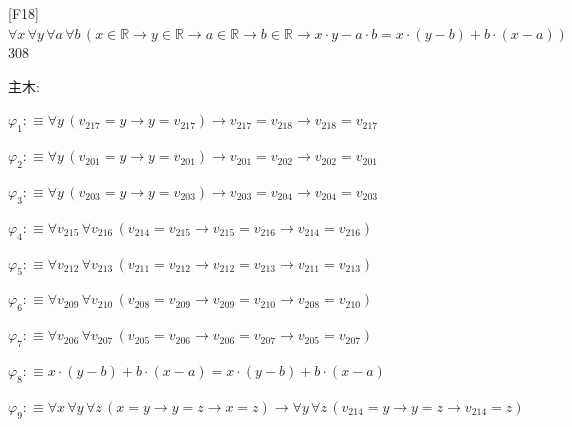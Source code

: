 \begin{fullproof}{[F18]}{$\forall x\,\forall y\,\forall a\,\forall b\,(x \in \mathbb{R} \to y \in \mathbb{R} \to a \in \mathbb{R} \to b \in \mathbb{R} \to x \cdot y - a \cdot b = x \cdot (y - b) + b \cdot (x - a))$}{308}
\begin{ptree}
\noLine
{}
\end{ptree}
\noindent 主木:
\begin{ptree}
\noLine
{}
\noLine
{}
\end{ptree}
\begin{abbrevlist}
\item $\varphi_{1} :\equiv \forall y\,(v_{217} = y \to y = v_{217}) \to v_{217} = v_{218} \to v_{218} = v_{217}$
\item $\varphi_{2} :\equiv \forall y\,(v_{201} = y \to y = v_{201}) \to v_{201} = v_{202} \to v_{202} = v_{201}$
\item $\varphi_{3} :\equiv \forall y\,(v_{203} = y \to y = v_{203}) \to v_{203} = v_{204} \to v_{204} = v_{203}$
\item $\varphi_{4} :\equiv \forall v_{215}\,\forall v_{216}\,(v_{214} = v_{215} \to v_{215} = v_{216} \to v_{214} = v_{216})$
\item $\varphi_{5} :\equiv \forall v_{212}\,\forall v_{213}\,(v_{211} = v_{212} \to v_{212} = v_{213} \to v_{211} = v_{213})$
\item $\varphi_{6} :\equiv \forall v_{209}\,\forall v_{210}\,(v_{208} = v_{209} \to v_{209} = v_{210} \to v_{208} = v_{210})$
\item $\varphi_{7} :\equiv \forall v_{206}\,\forall v_{207}\,(v_{205} = v_{206} \to v_{206} = v_{207} \to v_{205} = v_{207})$
\item $\varphi_{8} :\equiv x \cdot (y - b) + b \cdot (x - a) = x \cdot (y - b) + b \cdot (x - a)$
\item $\varphi_{9} :\equiv \forall x\,\forall y\,\forall z\,(x = y \to y = z \to x = z) \to \forall y\,\forall z\,(v_{214} = y \to y = z \to v_{214} = z)$

\end{abbrevlist}
\end{fullproof}
